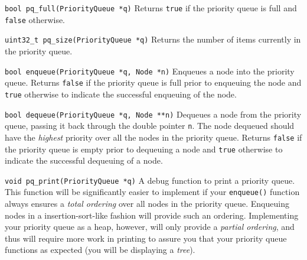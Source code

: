 \begin{funcdoc}{\texttt{bool pq\_full(PriorityQueue *q)}}
  Returns \texttt{true} if the priority queue is full and \texttt{false}
  otherwise.
\end{funcdoc}

\begin{funcdoc}{\texttt{uint32\_t pq\_size(PriorityQueue *q)}}
  Returns the number of items currently in the priority queue.
\end{funcdoc}

\begin{funcdoc}{\texttt{bool enqueue(PriorityQueue *q, Node *n)}}
  Enqueues a node into the priority queue. Returns \texttt{false} if the
  priority queue is full prior to enqueuing the node and \texttt{true}
  otherwise to indicate the successful enqueuing of the node.
\end{funcdoc}

\begin{funcdoc}{\texttt{bool dequeue(PriorityQueue *q, Node **n)}}
  Dequeues a node from the priority queue, passing it back through the
  double pointer \texttt{n}. The node dequeued should have the
  \emph{highest} priority over all the nodes in the priority queue.
  Returns \texttt{false} if the priority queue is empty prior to
  dequeuing a node and \texttt{true} otherwise to indicate the
  successful dequeuing of a node.
\end{funcdoc}

\begin{funcdoc}{\texttt{void pq\_print(PriorityQueue *q)}}
  A debug function to print a priority queue. This function will be
  significantly easier to implement if your \texttt{enqueue()} function
  always ensures a \emph{total ordering} over all nodes in the priority
  queue. Enqueuing nodes in a insertion-sort-like fashion will provide
  such an ordering. Implementing your priority queue as a heap, however,
  will only provide a \emph{partial ordering}, and thus will require
  more work in printing to assure you that your priority queue functions
  as expected (you will be displaying a \emph{tree}).
\end{funcdoc}
